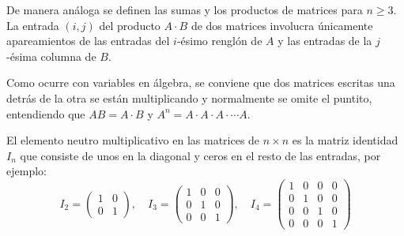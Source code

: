 De manera análoga se definen las sumas y los productos de matrices para $n\geq 3$. La entrada $(i,j)$ del producto $A\cdot B$ de dos matrices involucra únicamente apareamientos de las entradas del $i$-ésimo renglón de $A$ y las entradas de la $j$-ésima columna de $B$.

Como ocurre con variables en álgebra, se conviene que dos matrices escritas una detrás de la otra se están multiplicando y normalmente se omite el puntito, entendiendo que $AB=A\cdot B$ y $A^n=A\cdot A\cdot A\cdot \cdots A$.

El elemento neutro multiplicativo en las matrices de $n\times n$ es la matriz identidad $I_n$ que consiste de unos en la diagonal y ceros en el resto de las entradas, por ejemplo: 
$$ I_2=
\left(\begin{array}{cc}
1&0  \\
0&1
\end{array}\right),
\quad 
I_3=
\left(\begin{array}{ccc}
1&0&0  \\
0&1&0  \\
0&0&1
\end{array}\right),
\quad 
I_4=
\left(\begin{array}{cccc}
1&0&0&0  \\
0&1&0&0  \\
0&0&1&0  \\
0&0&0&1
\end{array}\right)
$$

